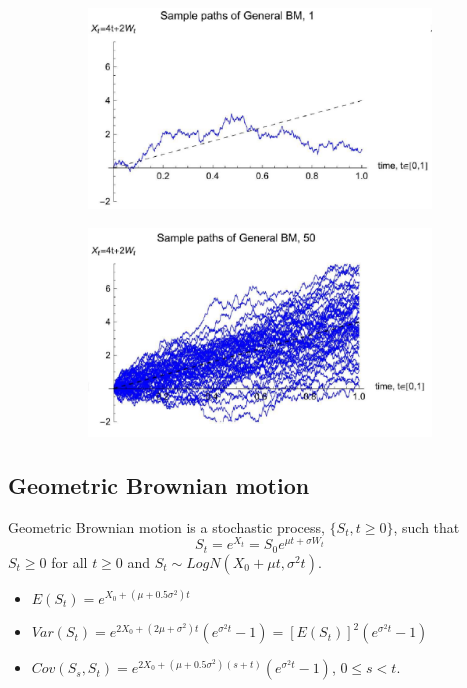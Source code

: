 \documentclass[11pt,a4paper]{book}
\theoremstyle{definition}\newtheorem{definition}{Definition}
\theoremstyle{definition}\newtheorem{fact}{Fact}
\theoremstyle{definition}\newtheorem{remark}{Remark}
\theoremstyle{definition}\newtheorem{ex}{Ex.}
\theoremstyle{definition}\newtheorem{project}{Project}
\theoremstyle{definition}\newtheorem{problem}{Problem}
\theoremstyle{definition}\newtheorem{example}{Example}
\numberwithin{theorem}{section}
\numberwithin{corollary}{chapter}
\numberwithin{assumption}{chapter}
\numberwithin{definition}{chapter}
\numberwithin{prop}{chapter}
\numberwithin{notation}{chapter}
\numberwithin{problem}{chapter}
\numberwithin{example}{chapter}
\numberwithin{fact}{chapter}
\numberwithin{ex}{chapter}
\begin{document}
\begin{figure}[H]
	\begin{subfigure}{0.5\textwidth}
		\centering
		\includegraphics[scale=0.5]{Chapter01/Chapter1_4.png}
	\end{subfigure}
	\begin{subfigure}{0.5\textwidth}
		\centering
		\includegraphics[scale=0.5]{Chapter01/Chapter1_5.png}
	\end{subfigure}
\end{figure}

\subsection{Geometric Brownian motion}
Geometric Brownian motion is a stochastic process, $\{S_t, t \geq 0\}$, such that
$$ S_t = e^{X_t} = S_0 e^{\mu t + \sigma W_t} $$
$ S_t \geq 0 $ for all $t \geq 0$ and $S_t \sim LogN(X_0+\mu t, \sigma^2 t)$.
\begin{itemize}
\item $E(S_t) = e^{X_0+(\mu+0.5\sigma^2)t}$
\item $Var(S_t) = e^{2X_0 + (2\mu + \sigma^2)t} (e^{\sigma^2 t} -1) = [E(S_t)]^2 (e^{\sigma^2 t}-1)$
\item $Cov(S_s,S_t) = e^{2X_0 + (\mu + 0.5\sigma^2)(s+t)}(e^{\sigma^2 t} -1)$, $0\leq s < t$.
\end{itemize}
\end{document}
